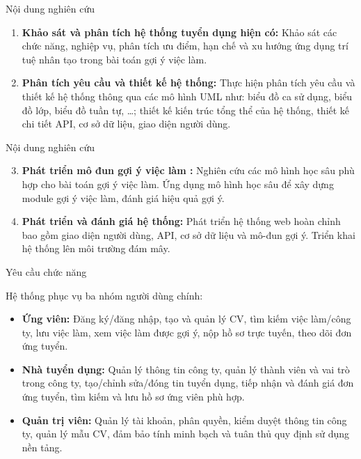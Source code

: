 \documentclass[aspectratio=169,xcolor=dvipsnames, t]{beamer}
\begin{document}
\begin{frame}{Nội dung nghiên cứu}
\justifying

\begin{enumerate}
    \item \textbf{Khảo sát và phân tích hệ thống tuyển dụng hiện có:} Khảo sát các chức năng, nghiệp vụ, phân tích ưu điểm, hạn chế và xu hướng ứng dụng trí tuệ nhân tạo trong bài toán gợi ý việc làm.
    \item \textbf{Phân tích yêu cầu và thiết kế hệ thống:} Thực hiện phân tích yêu cầu và thiết kế hệ thống thông qua các mô hình UML như: biểu đồ ca sử dụng, biểu đồ lớp, biểu đồ tuần tự, …; thiết kế kiến trúc tổng thể của hệ thống, thiết kế chi tiết API, cơ sở dữ liệu, giao diện người dùng.
\end{enumerate}

\end{frame}
\begin{frame}{Nội dung nghiên cứu}
\justifying

\begin{enumerate}
    \setcounter{enumi}{2}
    \item \textbf{Phát triển mô đun gợi ý việc làm :} Nghiên cứu các mô hình học sâu phù hợp cho bài toán gợi ý việc làm. Ứng dụng mô hình học sâu để xây dựng module gợi ý việc làm, đánh giá hiệu quả gợi ý.
    \item \textbf{Phát triển và đánh giá hệ thống:} Phát triển hệ thống web hoàn chỉnh bao gồm giao diện người dùng, API, cơ sở dữ liệu và mô-đun gợi ý. Triển khai hệ thống lên môi trường đám mây.
\end{enumerate}

\end{frame}



\begin{frame}{Yêu cầu chức năng}
\justifying

Hệ thống phục vụ ba nhóm người dùng chính:

\vspace{0.3cm}
\begin{itemize}
    \item \textbf{Ứng viên:} Đăng ký/đăng nhập, tạo và quản lý CV, tìm kiếm việc làm/công ty, lưu việc làm, xem việc làm được gợi ý, nộp hồ sơ trực tuyến, theo dõi đơn ứng tuyển.
    
    \item \textbf{Nhà tuyển dụng:} Quản lý thông tin công ty, quản lý thành viên và vai trò trong công ty, tạo/chỉnh sửa/đóng tin tuyển dụng, tiếp nhận và đánh giá đơn ứng tuyển, tìm kiếm và lưu hồ sơ ứng viên phù hợp.
    
    \item \textbf{Quản trị viên:} Quản lý tài khoản, phân quyền, kiểm duyệt thông tin công ty, quản lý mẫu CV, đảm bảo tính minh bạch và tuân thủ quy định sử dụng nền tảng.
\end{itemize}

\end{frame}
\end{document}
